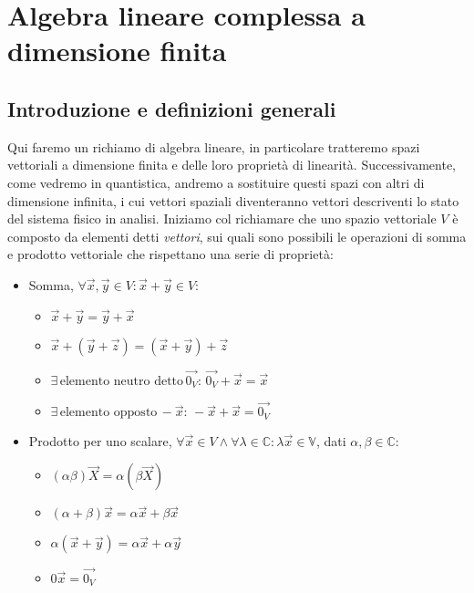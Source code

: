 \chapter{Algebra lineare complessa a dimensione finita}


\section{Introduzione e definizioni generali}

Qui faremo un richiamo di algebra lineare, in particolare tratteremo spazi vettoriali a dimensione finita e delle loro proprietà di linearità. Successivamente, come vedremo in quantistica, andremo a sostituire questi spazi con altri di dimensione infinita, i cui vettori spaziali diventeranno vettori descriventi lo stato del sistema fisico in analisi. Iniziamo col richiamare che uno spazio vettoriale $V$ è composto da elementi detti \textit{vettori}, sui quali sono possibili le operazioni di somma e prodotto vettoriale che rispettano una serie di proprietà:
\begin{itemize}
    \item Somma, $\forall \vec{x},\vec{y} \in V: \vec{x}+\vec{y} \in V$:
        \begin{itemize}
            \item $\vec{x} + \vec{y} = \vec{y} + \vec{x}$
            \item $\vec{x}+(\vec{y}+\vec{z}) = (\vec{x}+\vec{y})+\vec{z}$
            \item $\exists \, \text{elemento neutro detto} \, \vec{0_V}: \, \vec{0_V} + \vec{x} = \vec{x}$ 
            \item $\exists \, \text{elemento opposto} \, -\vec{x}: \, -\vec{x}+\vec{x} = \vec{0_V}$
        \end{itemize}
    \item Prodotto per uno scalare, $\forall \vec{x} \in V \land \forall \lambda \in \mathbb{C}: \lambda \vec{x} \in \mathbb{V}$, dati $\alpha, \beta \in \mathbb{C}$:
        \begin{itemize}
            \item $(\alpha \beta) \vec{X} = \alpha (\beta \vec{X})$
            \item $(\alpha+\beta)\vec{x} = \alpha\vec{x} + \beta\vec{x}$
            \item $\alpha(\vec{x}+\vec{y}) = \alpha\vec{x} + \alpha\vec{y}$
            \item $0 \vec{x} = \vec{0_V}$
        \end{itemize}
\end{itemize}
